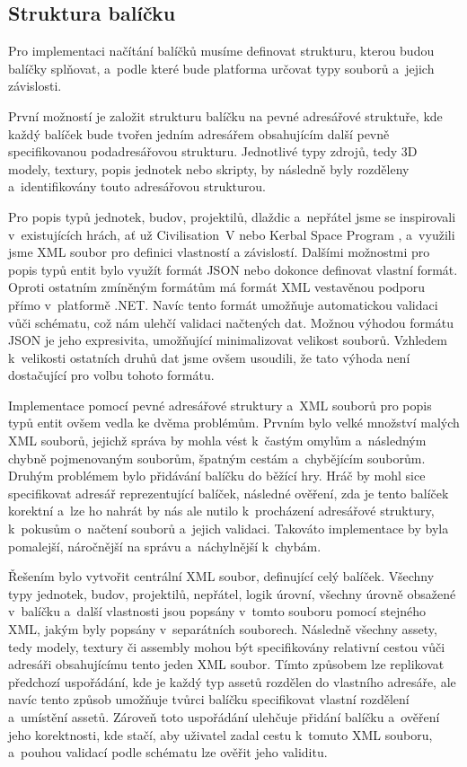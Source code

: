 \subsection{Struktura balíčku}
\label{sec:packagestructure}
Pro implementaci načítání balíčků musíme definovat strukturu, kterou budou balíčky splňovat, a~podle které bude platforma určovat typy souborů a~jejich závislosti.

První možností je založit strukturu balíčku na pevné adresářové struktuře, kde každý balíček bude tvořen jedním adresářem obsahujícím další pevně specifikovanou podadresářovou strukturu. Jednotlivé typy zdrojů, tedy 3D modely, textury, popis jednotek nebo skripty, by následně byly rozděleny a~identifikovány touto adresářovou strukturou. 

Pro popis typů jednotek, budov, projektilů, dlaždic a~nepřátel jsme se inspirovali v~existujících hrách, ať už Civilisation~V \citep{site:civ5} nebo Kerbal Space Program \citep{site:ksp}, a~využili jsme XML soubor pro definici vlastností a  závislostí. Dalšími možnostmi pro popis typů entit bylo využít formát JSON nebo dokonce definovat vlastní formát. Oproti ostatním zmíněným formátům má formát XML vestavěnou podporu přímo v~platformě .NET. Navíc tento formát umožňuje automatickou validaci vůči schématu, což nám ulehčí  validaci načtených dat. Možnou výhodou formátu JSON je jeho expresivita, umožňující minimalizovat velikost souborů. Vzhledem k~velikosti ostatních druhů dat jsme ovšem usoudili, že tato výhoda není dostačující pro volbu tohoto formátu. 

Implementace pomocí pevné adresářové struktury a~XML souborů pro popis typů entit ovšem vedla ke dvěma problémům. Prvním bylo velké množství malých XML souborů, jejichž správa by mohla vést k~častým omylům a~následným chybně pojmenovaným souborům, špatným cestám a~chybějícím souborům. Druhým problémem bylo přidávání balíčku do běžící hry. Hráč by mohl sice specifikovat adresář reprezentující balíček, následné ověření, zda je tento balíček korektní a~lze ho nahrát by nás ale nutilo k~procházení adresářové struktury, k~pokusům o~načtení souborů a~jejich validaci. Takováto implementace by byla pomalejší, náročnější na správu a~náchylnější k~chybám. 

Řešením bylo vytvořit centrální XML soubor, definující celý balíček. Všechny typy jednotek, budov, projektilů, nepřátel, logik úrovní, všechny úrovně obsažené v~balíčku a~další vlastnosti jsou popsány v~tomto souboru pomocí stejného XML, jakým byly popsány v~separátních souborech. Následně všechny assety, tedy modely, textury či assembly mohou být specifikovány relativní cestou vůči adresáři obsahujícímu tento jeden XML soubor. Tímto způsobem lze replikovat předchozí uspořádání, kde je každý typ assetů rozdělen do vlastního adresáře, ale navíc tento způsob umožňuje tvůrci balíčku specifikovat vlastní rozdělení a~umístění assetů. Zároveň toto uspořádání ulehčuje přidání balíčku a~ověření jeho korektnosti, kde stačí, aby uživatel zadal cestu k~tomuto XML souboru, a~pouhou validací podle schématu lze ověřit jeho validitu.

